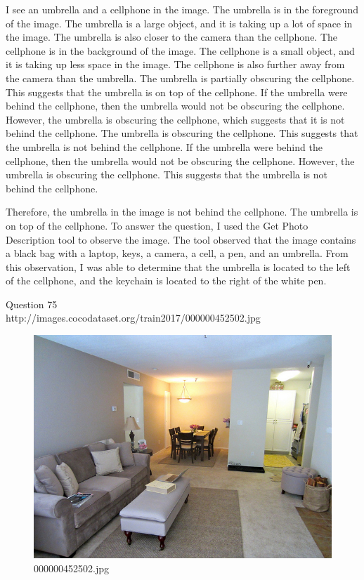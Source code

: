 \begin{enumerate}
    I see an umbrella and a cellphone in the image.
    The umbrella is in the foreground of the image. The umbrella is a large object, and it is taking up a lot of space in the image. The umbrella is also closer to the camera than the cellphone.
    The cellphone is in the background of the image. The cellphone is a small object, and it is taking up less space in the image. The cellphone is also further away from the camera than the umbrella.
    The umbrella is partially obscuring the cellphone. This suggests that the umbrella is on top of the cellphone.
    If the umbrella were behind the cellphone, then the umbrella would not be obscuring the cellphone. However, the umbrella is obscuring the cellphone, which suggests that it is not behind the cellphone.
    The umbrella is obscuring the cellphone. This suggests that the umbrella is not behind the cellphone. If the umbrella were behind the cellphone, then the umbrella would not be obscuring the cellphone. However, the umbrella is obscuring the cellphone. This suggests that the umbrella is not behind the cellphone.
    
    Therefore, the umbrella in the image is not behind the cellphone. The umbrella is on top of the cellphone.
    \subitem To answer the question, I used the Get Photo Description tool to observe the image. The tool observed that the image contains a black bag with a laptop, keys, a camera, a cell, a pen, and an umbrella. From this observation, I was able to determine that the umbrella is located to the left of the cellphone, and the keychain is located to the right of the white pen.
\end{enumerate}
Question 75\\
http://images.cocodataset.org/train2017/000000452502.jpg
\begin{figure}[h]
    \centering
    \includegraphics[width=0.8\linewidth]{../image set/hard/000000452502.jpg}
    \caption{000000452502.jpg}
\end{figure}

